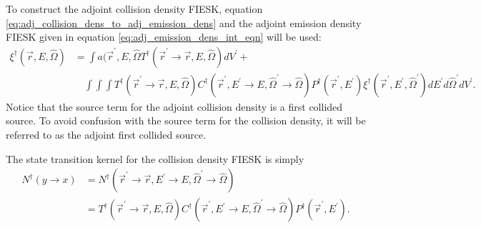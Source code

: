 To construct the adjoint collision density FIESK, equation 
\ref{eq:adj_collision_dens_to_adj_emission_dens} and the adjoint emission
density FIESK given in equation \ref{eq:adj_emission_dens_int_eqn} will be
used:
\begin{align}
  \xi^{\dagger}(\vec{r},E,\hat{\Omega}) & = \int a(\vec{r}^{'},E,\hat{\Omega}
  T^{\dagger}(\vec{r}^{'} \to \vec{r},E,\hat{\Omega}) dV^{'} + \nonumber \\
  &\quad \int\int\int T^{\dagger}(\vec{r}^{'} \to \vec{r},E,\hat{\Omega})
  C^{\dagger}(\vec{r}^{'},E^{'} \to E, \hat{\Omega}^{'} \to \hat{\Omega})
  P^{\dagger}(\vec{r}^{'},E^{'}) \xi^{\dagger}(\vec{r}^{'},E^{'},\hat{\Omega}^{'})
  dE^{'}d\hat{\Omega}^{'}dV^{'}.
  \label{eq:adj_collision_dens_int_eqn}
\end{align}
Notice that the source term for the adjoint collision density is a first
collided source. To avoid confusion with the source term for the collision
density, it will be referred to as the adjoint first collided source.

The state transition kernel for the collision density FIESK is simply
\begin{align}
  N^{\dagger}(y \to x) & =
  N^{\dagger}(\vec{r}^{'} \to \vec{r},E^{'} \to E,\hat{\Omega}^{'} \to \hat{\Omega})
  \nonumber \\
  & = T^{\dagger}(\vec{r}^{'} \to \vec{r},E,\hat{\Omega})
  C^{\dagger}(\vec{r}^{'},E^{'} \to E,\hat{\Omega}^{'} \to \hat{\Omega})
  P^{\dagger}(\vec{r}^{'},E^{'}).
\end{align}


